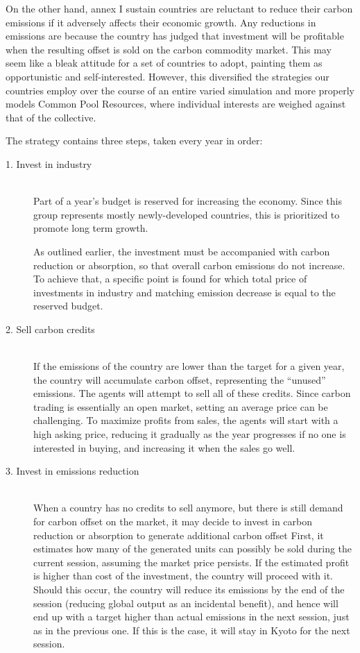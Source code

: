 \documentclass[]{article} %
\begin{document}
On the other hand, annex I sustain countries are reluctant to reduce their carbon emissions if it adversely affects their economic growth.   Any reductions in emissions are because the country has judged that investment will be profitable when the resulting offset is sold on the carbon commodity market.   This may seem like a bleak attitude for a set of countries to adopt, painting them as opportunistic and self-interested.   However, this diversified the strategies our countries employ over the course of an entire varied simulation and more properly models Common Pool Resources, where individual interests are weighed against that of the collective.

The strategy contains three steps, taken every year in order:

\begin{description}
\item[1. Invest in industry] \hfill \\
Part of a year’s budget is reserved for increasing the economy. Since this group represents mostly newly-developed countries, this is prioritized to promote long term growth.

As outlined earlier, the investment must be accompanied with carbon reduction or absorption, so that overall carbon emissions do not increase. To achieve that, a specific point is found for which total price of investments in industry and matching emission decrease is equal to the reserved budget.

\item[2. Sell carbon credits] \hfill \\
If the emissions of the country are lower than the target for a given year, the country will accumulate carbon offset, representing the “unused” emissions. The agents will attempt to sell all of these credits. Since carbon trading is essentially an open market, setting an average price can be challenging. To maximize profits from sales, the agents will start with a high asking price, reducing it gradually as the year progresses if no one is interested in buying, and increasing it when the sales go well.

\item[3. Invest in emissions reduction] \hfill \\
When a country has no credits to sell anymore, but there is still demand for carbon offset on the market, it may decide to invest in carbon reduction or absorption to generate additional carbon offset First, it estimates how many of the generated units can possibly be sold during the current session, assuming the market  price persists. If the estimated profit is higher than cost of the investment, the country will proceed with it. Should this occur, the country will reduce its emissions by the end of the session (reducing global output as an incidental benefit), and hence will end up with a target higher than actual emissions in the next session, just as in the previous one. If this is the case, it will stay in Kyoto for the next session.

\end{description}
\end{document}
